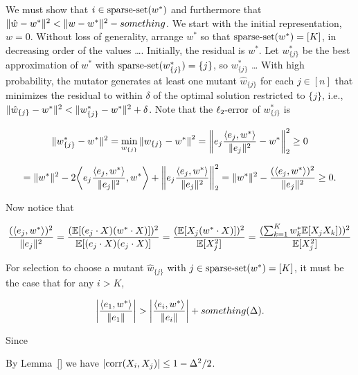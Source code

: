 We must show that $i \in \mathrm{sparse\mbox{-}set}(w^*)$ and furthermore that
$\Vert \hat{w} - w^* \Vert^2 < \Vert w - w^* \Vert^2 - something$.
We start with the initial representation, $w=0$.
Without loss of generality, arrange $w^*$ so that $\mathrm{sparse\mbox{-}set}(w^*) = [K]$,
in decreasing order of the values \dots. Initially, the residual is $w^*$.
Let $w^*_{\{j\}}$ be the best approximation of $w^*$ with
$\mathrm{sparse\mbox{-}set}(w^*_{\{j\}}) = \{j\}$, so $w^*_{\{j\}}$ \dots
With high probability, the mutator generates at least one mutant
$\hat{w}_{\{j\}}$ for each $j \in [n]$ that minimizes the residual to within
$\delta$ of the optimal solution restricted to $\{j\}$, i.e.,
$\Vert \hat{w}_{\{j\}} - w^* \Vert^2 < \Vert w^*_{\{j\}} - w^* \Vert^2 + \delta$.
Note that the $\mathrm{\ell_2\mbox{-}error}$ of $w^*_{\{j\}}$ is~

\[
\Vert w^*_{\{j\}} - w^* \Vert^2 = \min_{w_{\{j\}}}{\Vert w_{\{j\}} - w^* \Vert}^2
= \bigg \Vert e_j \frac{\langle e_j, w^* \rangle}{\Vert e_j \Vert^2} - w^* \bigg \Vert_2^2 \ge 0
\]

\[
= \Vert w^* \Vert^2 - 2 \bigg \langle e_j \frac{\langle e_j, w^* \rangle}{\Vert e_j \Vert^2}, w^* \bigg \rangle + \bigg \Vert e_j \frac{\langle e_j, w^* \rangle}{\Vert e_j \Vert^2} \bigg \Vert_2^2 
= \Vert w^* \Vert^2 - \frac{(\langle e_j, w^* \rangle)^2}{\Vert e_j \Vert^2} \ge 0.
\]

Now notice that

\[
\frac{(\langle e_j, w^* \rangle)^2}{\Vert e_j \Vert^2}
= \frac{(\mathbb{E}[(e_j \cdot X)(w^* \cdot X)])^2}{\mathbb{E}[(e_j \cdot X)(e_j \cdot X)]}
= \frac{(\mathbb{E}[X_j (w^* \cdot X)])^2}{\mathbb{E}[X_j^2]}
= \frac{(\sum_{k=1}^K w^*_k \mathbb{E}[X_j X_k]))^2}{\mathbb{E}[X_j^2]}
\]

For selection to choose a mutant $\hat{w}_{\{j\}}$ with
$j \in \mathrm{sparse\mbox{-}set}(w^*) = [K]$, it must be the case that for any $i > K$,

\[
\bigg\vert \frac{\langle e_1, w^* \rangle}{\Vert e_1 \Vert} \bigg\vert
> \bigg\vert \frac{\langle e_i, w^* \rangle}{\Vert e_i \Vert} \bigg\vert + something(\Delta).
\]

Since

By Lemma~\ref{} we have $|\mathrm{corr}(X_i, X_j)| \leq 1 - \Delta^2/2$.

